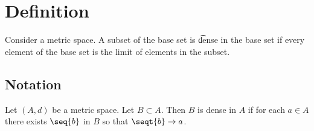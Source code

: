 

\section*{Definition}

Consider a metric space.
A subset of the base set is \t{dense} in the base set if every element of the base set is the limit of elements in the subset.

\subsection*{Notation}

Let $(A, d)$ be a metric space.
Let $B \subset A$.
Then $B$ is dense in $A$ if
for each $a \in A$ there exists
$\seq{b}$ in $B$ so that
$\seqt{b} \to a$.
